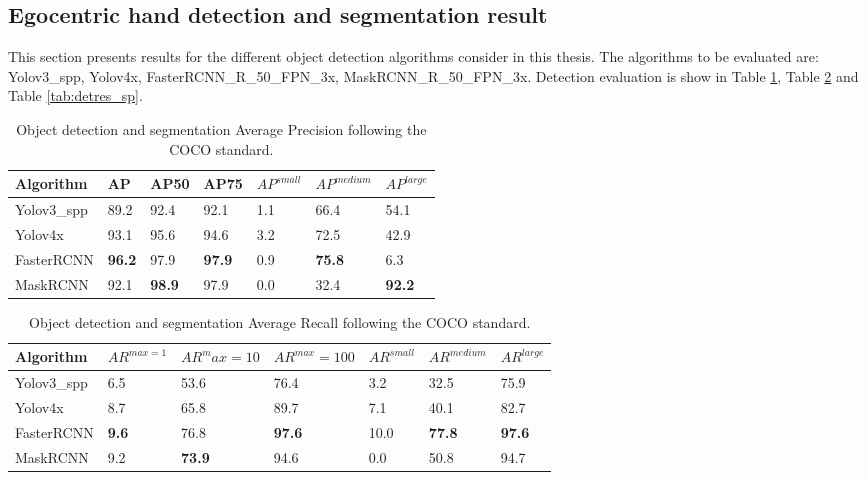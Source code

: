 \subsection{Egocentric hand detection and segmentation result}
This section presents results for the different object detection algorithms consider in this thesis. The algorithms to be evaluated are: Yolov3\_spp, Yolov4x, FasterRCNN\_R\_50\_FPN\_3x, MaskRCNN\_R\_50\_FPN\_3x. Detection evaluation is show in Table \ref{tab:detres_ap}, Table \ref{tab:detres_ar} and Table \ref{tab:detres_sp}.
\begin{table}[]
	\centering
	\label{tab:detres_ap}
	\begin{tabular}{|l|l|l|l|l|l|l|}
		\hline
		Algorithm                  & AP            & AP50          & AP75          & \(AP^{small}\) & \(AP^{medium}\)      & \(AP^{large}\)       \\ \hline
		Yolov3\_spp                & 89.2          & 92.4          & 92.1          & 1.1     & 66.4          & 54.1          \\ \hline
		Yolov4x                    & 93.1          & 95.6          & 94.6          & 3.2     & 72.5          & 42.9          \\ \hline
		FasterRCNN & \textbf{96.2} & 97.9          & \textbf{97.9} & 0.9     & \textbf{75.8} & 6.3           \\ \hline
		MaskRCNN  & 92.1          & \textbf{98.9} & 97.9          & 0.0     & 32.4          & \textbf{92.2} \\ \hline
	\end{tabular}
	\caption{Object detection and segmentation Average Precision following the COCO standard.}
\end{table}
	
\begin{table}[]
	
	\begin{tabular}{|l|l|l|l|l|l|l|}
		\hline
		Algorithm                  & \(AR^{max=1}\)      & \(AR^max=10\)      & \(AR^{max}=100\)     & \(AR^{small}\) & \(AR^{medium}\)      & \(AR^{large}\)       \\ \hline
		Yolov3\_spp                & 6.5          & 53.6          & 76.4          & 3.2     & 32.5          & 75.9          \\ \hline
		Yolov4x                    & 8.7          & 65.8          & 89.7          & 7.1     & 40.1          & 82.7          \\ \hline
		FasterRCNN & \textbf{9.6} & 76.8          & \textbf{97.6} & 10.0    & \textbf{77.8} & \textbf{97.6} \\ \hline
		MaskRCNN   & 9.2          & \textbf{73.9} & 94.6          & 0.0     & 50.8          & 94.7          \\ \hline
	\end{tabular}
	\label{tab:detres_ar}
	\caption{Object detection and segmentation Average Recall following the COCO standard.}
\end{table}

